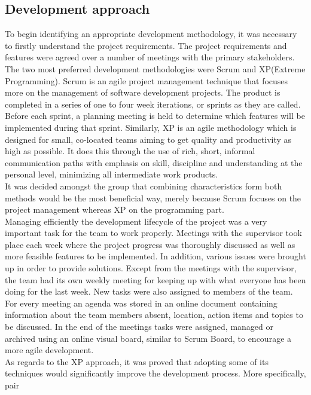 \subsection{Development approach} 
To begin identifying an appropriate development methodology, it was necessary to firstly understand 
the project requirements. The project requirements and features were agreed over a number of 
meetings with the primary stakeholders.\\ 
The two most preferred development methodologies were 
Scrum and XP(Extreme Programming). Scrum is an agile project management technique that focuses more 
on the management of software development projects. The product is completed in a series of one to 
four week iterations, or sprints as they are called. Before each sprint, a planning meeting is held 
to determine which features will be implemented during that sprint. Similarly, XP is an agile 
methodology which is designed for small, co-located teams aiming to get quality and productivity as 
high as possible. It does this through the use of rich, short, informal communication paths with 
emphasis on skill, discipline and understanding at the personal level, minimizing all intermediate 
work products.\\ 
It was decided amongst the group that combining characteristics form both methods 
would be the most beneficial way, merely because Scrum focuses on the project management whereas XP 
on the programming part.\\ 
Managing efficiently the development lifecycle of the project was a very 
important task for the team to work properly. Meetings with the supervisor took place each week 
where the project progress was thoroughly discussed as well as more feasible features to be 
implemented. In addition, various issues were brought up in order to provide solutions. Except from 
the meetings with the supervisor, the team had its own weekly meeting for keeping up with what 
everyone has been doing for the last week. New tasks were also assigned to members of the team. For 
every meeting an agenda was stored in an online document containing information about the team 
members absent, location, action items and topics to be discussed. In the end of the meetings tasks 
were assigned, managed or archived using an online visual board, similar to Scrum Board, to 
encourage a more agile development.\\ 
As regards to the XP approach, it was proved that adopting 
some of its techniques would significantly improve the development process. More specifically, pair 
